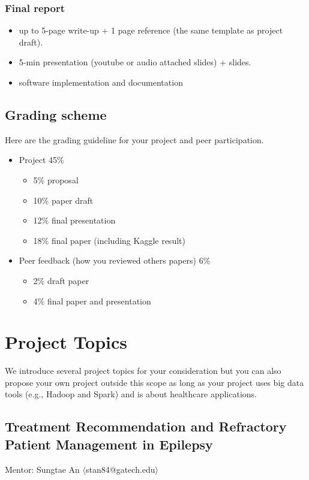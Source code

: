 \documentclass[journal]{IEEEtran}
\begin{document}
\subsubsection{Final report}
\begin{itemize}
\item up to 5-page write-up + 1 page reference (the same template as project draft).
\item 5-min presentation (youtube or audio attached slides) + slides.
\item software implementation and documentation
\end{itemize}


\subsection{Grading scheme}
Here are the grading guideline for your project and peer participation.
\begin{itemize}
\item Project 45\%
\begin{itemize}
\item 5\% proposal
\item 10\% paper draft 
\item 12\% final presentation 
\item 18\% final paper (including Kaggle result)
\end{itemize}
\item Peer feedback (how you reviewed others papers) 6\%
\begin{itemize}
\item 2\% draft paper
\item 4\% final paper and presentation
\end{itemize}
\end{itemize}

\section{Project Topics}
We introduce several project topics for your consideration but you can also propose your own project outside this scope as long as your project uses big data tools (e.g., Hadoop and Spark) and is about healthcare applications. 

\subsection{Treatment Recommendation and Refractory Patient Management in Epilepsy}
Mentor: Sungtae An $\langle$stan84@gatech.edu$\rangle$
\end{document}

